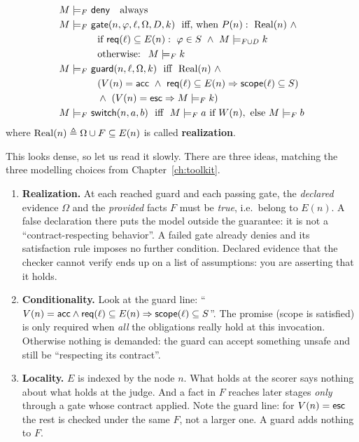 \begin{align*}
M\models_F&\ \deny\quad\text{always}\\
M\models_F&\ \gate(n,\varphi,\ell,\Omega,D,k)\ \text{ iff, when }P(n):\ \Real(n)\ \wedge\\
&\quad\text{if }\req(\ell)\subseteq E(n):\ \varphi\in S\ \wedge\ M\models_{F\cup D}k\\
&\quad\text{otherwise: }\ M\models_F k\\
M\models_F&\ \guard(n,\ell,\Omega,k)\ \text{ iff }\ \Real(n)\ \wedge\\
&\quad(V(n)=\acc\ \wedge\ \req(\ell)\subseteq E(n)\Rightarrow\scope(\ell)\subseteq S)\\
&\quad\wedge\ (V(n)=\esc\Rightarrow M\models_F k)\\
M\models_F&\ \switch(n,a,b)\ \text{ iff }\ M\models_F a\text{ if }W(n),\ \text{else }M\models_F b
\end{align*}
where $\mathrm{Real}(n)\triangleq\Omega\cup F\subseteq E(n)$ is called \textbf{realization}.

This looks dense, so let us read it slowly. There are three ideas, matching the three modelling choices from Chapter~\ref{ch:toolkit}.

\begin{enumerate}
\item \textbf{Realization.} At each reached guard and each passing gate, the \emph{declared} evidence $\Omega$ and the \emph{provided} facts $F$ must be \emph{true}, i.e.\ belong to $E(n)$. A false declaration there puts the model outside the guarantee: it is not a ``contract-respecting behavior''. A failed gate already denies and its satisfaction rule imposes no further condition. Declared evidence that the checker cannot verify ends up on a list of assumptions: you are asserting that it holds.
\item \textbf{Conditionality.} Look at the guard line: ``$V(n)=\mathsf{acc}\wedge\mathsf{req}(\ell)\subseteq E(n)\Rightarrow\mathsf{scope}(\ell)\subseteq S$''. The promise (scope is satisfied) is only required when \emph{all} the obligations really hold at this invocation. Otherwise nothing is demanded: the guard can accept something unsafe and still be ``respecting its contract''.
\item \textbf{Locality.} $E$ is indexed by the node $n$. What holds at the scorer says nothing about what holds at the judge. And a fact in $F$ reaches later stages \emph{only} through a gate whose contract applied. Note the guard line: for $V(n)=\mathsf{esc}$ the rest is checked under the same $F$, not a larger one. A guard adds nothing to $F$.
\end{enumerate}

